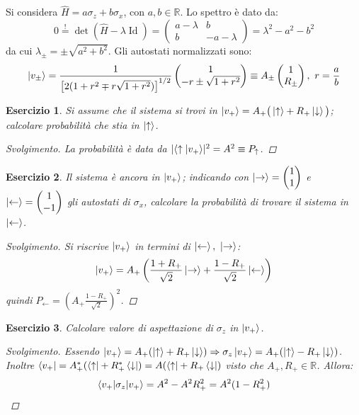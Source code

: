 \documentclass[10pt, a4paper]{scrartcl} %
\numberwithin{equation}{subsection}
\theoremstyle{style2}
\theoremstyle{style1}
\newtheorem{esercizio}{Esercizio}[section]
\renewcommand\qedsymbol{$\blacksquare$}
\newenvironment{svolgimento}{\renewcommand\qedsymbol{$\spadesuit$}\begin{proof}[Svolgimento]}{\end{proof}}
\begin{document}
	Si considera $\hat{H} = a \sigma _z + b \sigma _x$, con $a,b \in \mathbb{R}$. Lo spettro \`e dato da:
	\begin{equation*}
		0 \stackrel{!}{=} \det ( \hat{H} - \lambda  \operatorname{Id} ) = \begin{pmatrix} a - \lambda & b \\ b & - a - \lambda  \end{pmatrix} = \lambda ^2 - a^2 - b^2
	\end{equation*}
	da cui $\lambda _{\pm} = \pm \sqrt{a^2 + b^2} $. Gli autostati normalizzati sono:
	\[
	\ket{v_{\pm}}  = \frac{1}{\left[ 2 ( 1+ r^2 \mp r\sqrt{1+r^2} ) \right] ^{ 1/2} } \begin{pmatrix} 1 \\ -r \pm \sqrt{1+ r^2}  \end{pmatrix} \equiv A_{\pm}  \begin{pmatrix} 1 \\ R_{\pm}   \end{pmatrix}, \ r = \frac{a}{b}
	\] 
\begin{esercizio}
	Si assume che il sistema si trovi in $\ket{v_+}  = A_+ \big(\ket{\uparrow} + R_+ \ket{\downarrow} \big)$; calcolare probabilit\`a che stia in $\ket{\uparrow} $.
	\begin{svolgimento}
		La probabilit\`a \`e data da $\lvert \braket{\uparrow|v_+}  \rvert ^2 = A^2 \equiv P_\uparrow$.
	\end{svolgimento}
\end{esercizio}
\begin{esercizio}
Il sistema \`e ancora in $\ket{v_+}$; indicando con $\ket{\rightarrow} = \begin{pmatrix} 1\\ 1 \end{pmatrix} $	e $\ket{\leftarrow} = \begin{pmatrix} 1 \\ -1 \end{pmatrix}  $ gli autostati di $\sigma _x$, calcolare la probabilit\`a di trovare il sistema in $\ket{\leftarrow} $.
\begin{svolgimento}
	Si riscrive $\ket{v_+} $ in termini di $\ket{\leftarrow}, \ \ket{\rightarrow} $:
	\[
	\ket{v_+} = A_+ \left(\frac{1+R_+}{\sqrt{2} }\ket{\rightarrow} + \frac{1-R_+}{\sqrt{2} }\ket{\leftarrow} \right) 
	\] 
quindi $P_\leftarrow = \displaystyle \left(A_+\frac{1-R_+}{\sqrt{2} }\right) ^2$.
\end{svolgimento}
\end{esercizio}
\begin{esercizio}
	Calcolare valore di aspettazione di $\sigma _z$ in $\ket{v_+} $.
	\begin{svolgimento}
		Essendo $\ket{v_+} = A_+(\ket{\uparrow} + R_+ \ket{\downarrow}) \Rightarrow \sigma _z \ket{v_+} = A_+(\ket{\uparrow} - R_+ \ket{\downarrow}) $. Inoltre $\bra{v_+} = A_+^* (\bra{\uparrow} + R_+^* \bra{\downarrow} ) = A(\bra{\uparrow} + R_+ \bra{\downarrow} )$ visto che $A_+, R_+ \in \mathbb{R}$. Allora:
		\[
		\braket{v_+|\sigma _z|v_+} = A^2 - A^2 R_+^2 = A^2 (1-R_+^2)
		\] 
	\end{svolgimento}
\end{esercizio}
\end{document}
